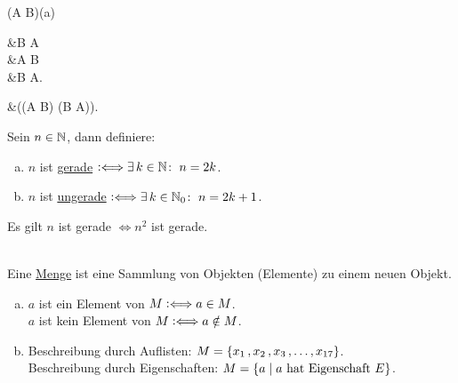 \documentclass[../ana1.tex]{subfiles}
\begin{document}
\begin{bem}\leavevmode
	\begin{alignenum}{(A \Leftrightarrow B)}{(a)}
		\begin{aitem}
			 &\Leftrightarrow B  A\\
										  &\Leftrightarrow A  B\\
										  &\Leftrightarrow \neg B \Rightarrow \neg A.
		\end{aitem}\begin{aitem}
			 &\Leftrightarrow ((A \Rightarrow B) \wedge (B \Rightarrow A)).
		\end{aitem}
	\end{alignenum}
\end{bem}

\begin{defi*}
	Sein \(n \in \mathbb{N} \), dann definiere:
	\begin{enumerate}[(a)]
		\item \(n \) ist \underline{gerade} \(\mathrel{\vcentcolon\Longleftrightarrow} \exists \, k \in \mathbb{N} \colon \; n = 2k \).
		\item \(n \) ist \underline{ungerade} \(\mathrel{\vcentcolon\Longleftrightarrow} \exists \, k \in \mathbb{N}_{0} \colon \; n = 2k + 1 \).
	\end{enumerate}
\end{defi*}

\begin{bsp}
	Es gilt \(n \) ist gerade \(\iff n^2 \) ist gerade.
	\begin{bew}
	\end{bew}
\end{bsp}

\begin{defi*}\leavevmode \\
	Eine \underline{Menge} ist eine Sammlung von Objekten (Elemente) zu einem neuen Objekt.
\end{defi*}

\begin{notation}\leavevmode
	\begin{enumerate}[(a)]
		\item \(a \) ist ein Element von \(M \mathrel{\vcentcolon\Longleftrightarrow} a \in M \).\\
			  \(a \) ist kein Element von \(M \mathrel{\vcentcolon\Longleftrightarrow} a \notin M \).
		\item Beschreibung durch Auflisten: \(M = \{x_{1} \operatorname{,} x_{2} \operatorname{,} x_{3} \operatorname{,} \ldots \operatorname{,} x_{17}\} \).\\
			  Beschreibung durch Eigenschaften: \(M = \{a \; \vert \; a \text{ hat Eigenschaft } E\} \).
	\end{enumerate}
\end{notation}
\end{document}
